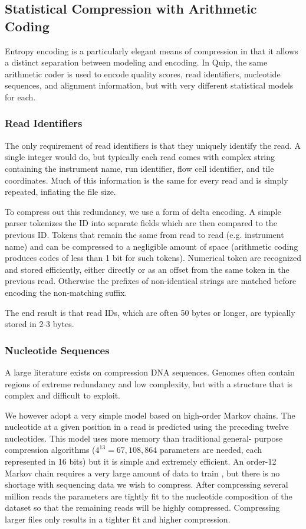 \documentclass[twocolumn]{article}
\begin{document}
\subsection{Statistical Compression with Arithmetic Coding}

Entropy encoding is a particularly elegant means of compression in that it
allows a distinct separation between modeling and encoding. In Quip, the same
arithmetic coder is used to encode quality scores, read identifiers,
nucleotide sequences, and alignment information, but with very different
statistical models for each.


\subsubsection{Read Identifiers}

The only requirement of read identifiers is that they uniquely identify the
read. A single integer would do, but typically each read comes with complex
string containing the instrument name, run identifier, flow cell identifier,
and tile coordinates. Much of this information is the same for every read and
is simply repeated, inflating the file size.

To compress out this redundancy, we use a form of delta encoding. A simple
parser tokenizes the ID into separate fields which are then compared to the
previous ID. Tokens that remain the same from read to read (e.g. instrument
name) and can be compressed to a negligible amount of space (arithmetic coding
produces codes of less than 1 bit for such tokens). Numerical token are
recognized and stored efficiently, either directly or as an offset from the
same token in the previous read. Otherwise the prefixes of non-identical
strings are matched before encoding the non-matching suffix.

The end result is that read IDs, which are often 50 bytes or longer, are
typically stored in 2-3 bytes.


\subsubsection{Nucleotide Sequences}

A large literature exists on compression DNA sequences. Genomes 
often contain regions of extreme redundancy and low complexity, but
with a structure that is complex and difficult to exploit.

We however adopt a very simple model based on high-order Markov chains. The
nucleotide at a given position in a read is predicted using the preceding
twelve nucleotides. This model uses more memory than traditional general-
purpose compression algorithms ($4^{13} = 67,108,864$ parameters are needed,
each represented in 16 bits)  but it is simple and extremely efficient. An
order-12 Markov chain requires a very large amount of data to train , but
there is no shortage with sequencing data we wish to compress. After
compressing several million reads the parameters are tightly fit to the
nucleotide composition of the dataset so that the remaining reads will be
highly compressed. Compressing larger files only results in a tighter fit and
higher compression.
\end{document}
